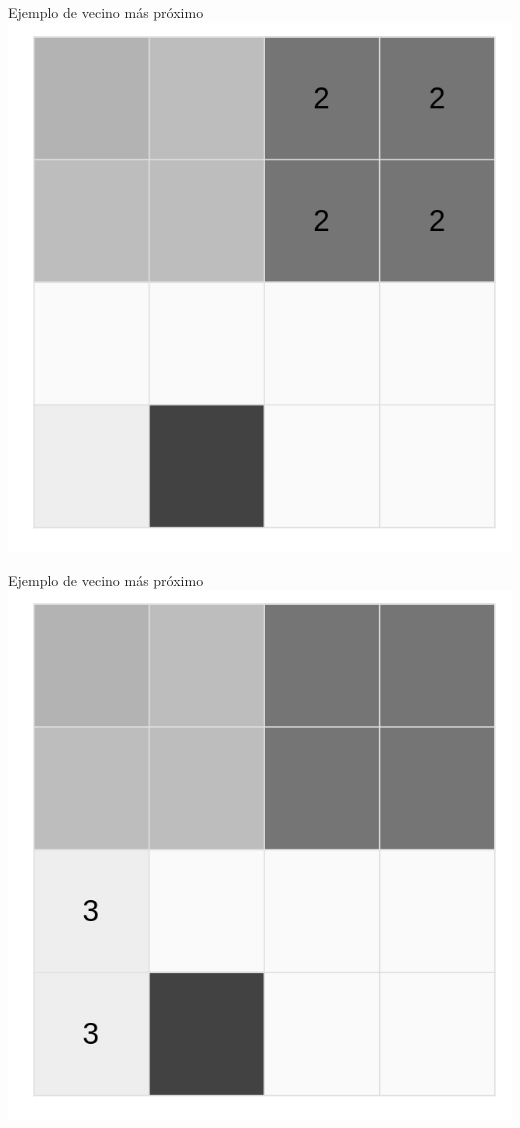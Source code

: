 \documentclass[
  11pt,
  ignorenonframetext,
]{beamer}
\begin{document}
\begin{frame}{Ejemplo de vecino más próximo}
\protect\hypertarget{ejemplo-de-vecino-muxe1s-pruxf3ximo-3}{}
\includegraphics{Interpolacion/Ejemplo-vecino-3.png}
\end{frame}

\begin{frame}{Ejemplo de vecino más próximo}
\protect\hypertarget{ejemplo-de-vecino-muxe1s-pruxf3ximo-4}{}
\includegraphics{Interpolacion/Ejemplo-vecino-4.png}
\end{frame}
\end{document}
